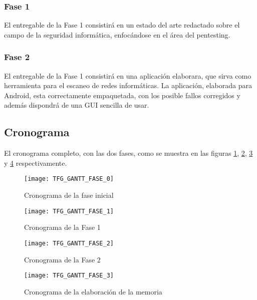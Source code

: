 \subsubsection{Fase 1}
El entregable de la Fase 1 consistirá en un estado del arte redactado sobre el campo de la seguridad informática, enfocándose en el área del pentesting.

\subsubsection{Fase 2}
El entregable de la Fase 1 consistirá en una aplicación elaborara, que sirva como herramienta para el escaneo de redes informáticas. La aplicación, elaborada para Android, esta correctamente empaquetada, con los posible fallos corregidos y además dispondrá de una GUI sencilla de usar.



\subsection{Cronograma}
El cronograma completo, con las dos fases, como se muestra en las figuras \ref{fig:gantt0}, \ref{fig:gantt1}, \ref{fig:gantt2} y \ref{fig:gantt3} respectivamente.

\begin{figure}[H]
	\centering
	\texttt{[image: TFG\_GANTT\_FASE\_0]}
	\caption{Cronograma de la fase inicial}
	\label{fig:gantt0}
\end{figure}

\begin{landscape}

\begin{figure}[H]
	\centering
	\texttt{[image: TFG\_GANTT\_FASE\_1]}
	\caption{Cronograma de la Fase 1}
	\label{fig:gantt1}
\end{figure}

\begin{figure}[H]
	\centering
	\texttt{[image: TFG\_GANTT\_FASE\_2]}
	\caption{Cronograma de la Fase 2}
	\label{fig:gantt2}
\end{figure}

\end{landscape}

\begin{figure}[H]
	\centering
	\texttt{[image: TFG\_GANTT\_FASE\_3]}
	\caption{Cronograma de la elaboración de la memoria}
	\label{fig:gantt3}
\end{figure}





